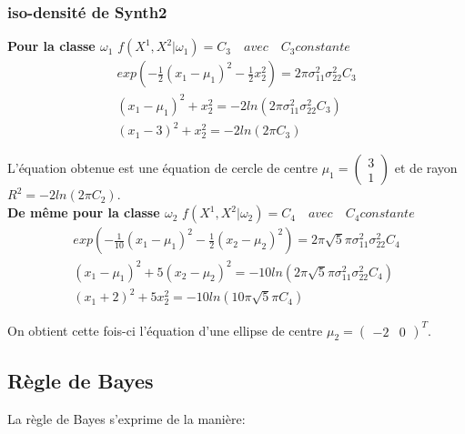 \documentclass[10pt]{article}
\begin{document}
\subsubsection{iso-densité de Synth2}
\textbf{Pour la classe $\omega_{1}$} $f(X^{1}, X^{2}|\omega_{1}) = C_{3} \quad avec \quad C_{3} constante$
\begin{equation}
\begin{split}
exp(-\frac{1}{2} (x_{1}-\mu_{1})^{2} - \frac{1}{2}x_{2}^{2})  = 2 \pi \sigma_{11}^{2} \sigma_{22}^{2} C_{3}
\\
(x_{1} - \mu_{1})^{2} +  x_{2}^{2} = -2ln(2 \pi \sigma_{11}^{2} \sigma_{22}^{2} C_{3})
\\
(x_{1} - 3)^{2} + x_{2}^{2} = -2 ln(2\pi C_{3})
\end{split}
\label{9}
\end{equation}

L'équation obtenue est une équation de cercle de centre $\mu_{1} = \begin{pmatrix} 3 \\ 1\end{pmatrix} $ et de rayon $R^{2} = -2 ln(2\pi C_{2})$.\\

\textbf{De même pour la classe $\omega_{2}$} $f(X^{1}, X^{2}|\omega_{2}) = C_{4} \quad avec \quad C_{4} constante$
\begin{equation}
\begin{split}
exp(-\frac{1}{10} (x_{1}-\mu_{1})^{2} - \frac{1}{2}(x_{2}-\mu_{2})^{2})  = 2\pi\sqrt{5} \pi \sigma_{11}^{2} \sigma_{22}^{2} C_{4}
\\
(x_{1} - \mu_{1})^{2} +  5(x_{2}-\mu_{2})^{2}  = -10ln(2\pi\sqrt{5}  \pi \sigma_{11}^{2} \sigma_{22}^{2} C_{4})
\\
(x_{1} + 2)^{2} + 5x_{2}^{2} = -10ln(10\pi\sqrt{5}\pi C_{4})
\label{10}
\end{split}
\end{equation}

On obtient cette fois-ci l'équation d'une ellipse de centre $\mu_{2} = \begin{pmatrix} -2 & 0\end{pmatrix}^{T}$.

\subsection{Règle de Bayes}
La règle de Bayes s'exprime de la manière:
\end{document}
